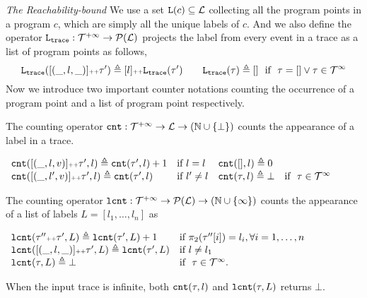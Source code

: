 \emph{The Reachability-bound}
We use a set $\mathtt{L}(c) \subseteq \mathcal{L}$ collecting all the program points in a program $c$, which are simply all the unique labels of $c$.
%
And we also define the operator $\mathtt{L}_{\mathtt{{trace}}} : \mathcal{T}^{+\infty} \to \mathcal{P}{(\mathcal{L})}$ projects the label from every event in a trace as a list of program points as follows,
{\small
\[
\mathtt{L}_{\mathtt{{trace}}}([(\_, l, \_)] {\scriptscriptstyle ++} \mathtt{\tau}') \triangleq [l] {\scriptscriptstyle ++} \mathtt{L}_{\mathtt{{trace}}}(\mathtt{\tau}')
\qquad
\mathtt{L}_{\mathtt{{trace}}}(\mathtt{\tau}) \triangleq []~~ \mbox{if}~~ \mathtt{\tau} = [] \lor \mathtt{\tau} \in \mathcal{T}^{\infty}
\]
}
Now we introduce two important counter notations counting the occurrence of a program point and a list of program point respectively.
\begin{defn}
  \label{def:counter}
The counting operator $\mathtt{cnt} : \mathcal{T}^{+\infty} \to \mathcal{L} \to (\mathbb{N} \cup \{\bot\})$
counts the appearance of a label in a trace.
\begin{center}
{\small
$
\begin{array}{llll}
\mathtt{cnt}([(\_, l, v)] {\scriptscriptstyle ++} \mathtt{\tau}', l ) \triangleq \mathtt{cnt}(\mathtt{\tau}', l) + 1 & \text{if}~ l = l
&
\mathtt{cnt}({[]}, l) \triangleq 0 & 
\\
\mathtt{cnt}([(\_, l', v)] {\scriptscriptstyle ++} \mathtt{\tau}', l) \triangleq \mathtt{cnt}(\mathtt{\tau}', l)   & \text{if}~ l' \neq l
&
\mathtt{cnt}(\mathtt{\tau}, l) \triangleq \bot & \text{if }~ \mathtt{\tau} \in \mathcal{T}^{\infty}
\end{array}
$
}
\end{center}
\end{defn}
\begin{defn}
  \label{def:lcounter}
  The counting operator $\mathtt{lcnt} : \mathcal{T}^{+\infty} \to \mathcal{P}(\mathcal{L}) \to (\mathbb{N} \cup \{\infty\})$
  counts the appearance of a list of labels $L = [l_1, \ldots, l_n]$ as
{\small
\begin{center}
  $
  \begin{array}{ll}
    \mathtt{lcnt}(\mathtt{\tau}'' {\scriptscriptstyle ++} \mathtt{\tau}', L ) 
    \triangleq \mathtt{lcnt}(\mathtt{\tau}', L) + 1  & \text{if}~ \pi_2(\mathtt{\tau}''[i]) = l_i, \forall i = 1, \ldots, n
    \\ 
    \mathtt{lcnt}([(\_, l, \_)] {\scriptscriptstyle ++} \mathtt{\tau}', L ) 
    \triangleq \mathtt{lcnt}(\mathtt{\tau}', L) & \text{if}~ l \neq l_1
    \\ 
    \mathtt{lcnt}(\mathtt{\tau}, L ) 
    \triangleq \bot & \text{if }~ \mathtt{\tau} \in \mathcal{T}^{\infty}.
    \end{array}
    $
  \end{center}
  }
\end{defn}
%
When the input trace is infinite, both $\mathtt{cnt}(\mathtt{\tau}, l)$ and  $\mathtt{lcnt}(\mathtt{\tau}, L)$ returns $\bot$.

